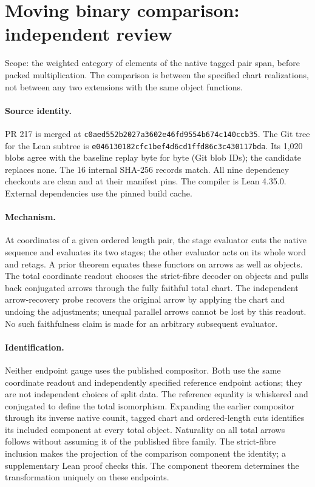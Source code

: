 \section*{Moving binary comparison: independent review}
Scope: the weighted category of elements of the native tagged pair span, before packed multiplication. The comparison is between the specified chart realizations, not between any two extensions with the same object functions.
\paragraph{Source identity.} PR 217 is merged at \texttt{c0aed552b2027a3602e46fd9554b674c140ccb35}. The Git tree for the Lean subtree is \texttt{e046130182cfc1bef4d6cd1ffd86c3c430117bda}. Its 1,020 blobs agree with the baseline replay byte for byte (Git blob IDs); the candidate replaces none. The 16 internal SHA-256 records match. All nine dependency checkouts are clean and at their manifest pins. The compiler is Lean 4.35.0. External dependencies use the pinned build cache.
\paragraph{Mechanism.} At coordinates of a given ordered length pair, the stage evaluator cuts the native sequence and evaluates its two stages; the other evaluator acts on its whole word and retags. A prior theorem equates these functors on arrows as well as objects. The total coordinate readout chooses the strict-fibre decoder on objects and pulls back conjugated arrows through the fully faithful total chart. The independent arrow-recovery probe recovers the original arrow by applying the chart and undoing the adjustments; unequal parallel arrows cannot be lost by this readout. No such faithfulness claim is made for an arbitrary subsequent evaluator.
\paragraph{Identification.} Neither endpoint gauge uses the published compositor. Both use the same coordinate readout and independently specified reference endpoint actions; they are not independent choices of split data. The reference equality is whiskered and conjugated to define the total isomorphism. Expanding the earlier compositor through its inverse native counit, tagged chart and ordered-length cuts identifies its included component at every total object. Naturality on all total arrows follows without assuming it of the published fibre family. The strict-fibre inclusion makes the projection of the comparison component the identity; a supplementary Lean proof checks this. The component theorem determines the transformation uniquely on these endpoints.

